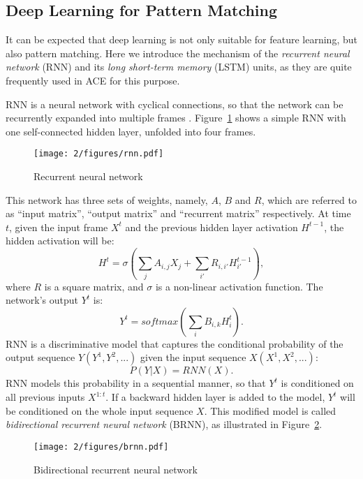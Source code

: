 \subsection{Deep Learning for Pattern Matching} \label{sec:2-rnnpm}
It can be expected that deep learning is not only suitable for feature learning, but also pattern matching. Here we introduce the mechanism of the {\it recurrent neural network} (RNN) and its {\it long short-term memory} (LSTM) units, as they are quite frequently used in ACE for this purpose.

RNN is a neural network with cyclical connections, so that the network can be recurrently expanded into multiple frames \cite{elman1990finding,jordan1986attractor,lang1990time}. Figure~\ref{fig:2-rnn} shows a simple RNN with one self-connected hidden layer, unfolded into four frames.
\begin{figure}[htb]
\centering
\texttt{[image: 2/figures/rnn.pdf]}
\caption{Recurrent neural network}
\label{fig:2-rnn}
\end{figure}
This network has three sets of weights, namely, $A$, $B$ and $R$, which are referred to as ``input matrix'', ``output matrix'' and ``recurrent matrix'' respectively. At time $t$, given the input frame $X^t$ and the previous hidden layer activation $H^{t-1}$, the hidden activation will be:
\begin{equation}
H^t = \sigma(\sum_j A_{i,j}X_j + \sum_{i'} R_{i,i'}H^{t-1}_{i'}),
\end{equation}
where $R$ is a square matrix, and $\sigma$ is a non-linear activation function. The network's output $Y^t$ is:
\begin{equation}
Y^t = softmax(\sum_i B_{i,k}H^t_i).
\end{equation}
RNN is a discriminative model that captures the conditional probability of the output sequence $Y (Y^1,Y^2,...)$ given the input sequence $X (X^1, X^2,...)$:
\begin{equation}
P(Y|X) = RNN(X).
\end{equation}
RNN models this probability in a sequential manner, so that $Y^t$ is conditioned on all previous inputs $X^{1:t}$. If a backward hidden layer is added to the model, $Y^t$ will be conditioned on the whole input sequence $X$. This modified model is called {\it bidirectional recurrent neural network} (BRNN), as illustrated in Figure~\ref{fig:2-brnn}.
\begin{figure}[htb]
\centering
\texttt{[image: 2/figures/brnn.pdf]}
\caption{Bidirectional recurrent neural network}
\label{fig:2-brnn}
\end{figure}

